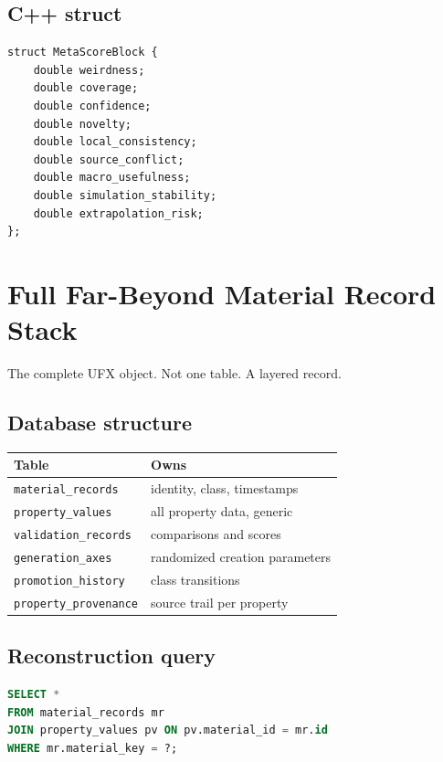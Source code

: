 \documentclass[11pt, a4paper]{article}
\begin{document}
\subsection{C++ struct}

\begin{lstlisting}
struct MetaScoreBlock {
    double weirdness;
    double coverage;
    double confidence;
    double novelty;
    double local_consistency;
    double source_conflict;
    double macro_usefulness;
    double simulation_stability;
    double extrapolation_risk;
};
\end{lstlisting}

\section{Full Far-Beyond Material Record Stack}

The complete UFX object. Not one table. A layered record.

\subsection{Database structure}

\begin{center}
\begin{tabular}{ll}
\toprule
\textbf{Table} & \textbf{Owns} \\
\midrule
\texttt{material\_records}  & identity, class, timestamps \\
\texttt{property\_values}   & all property data, generic \\
\texttt{validation\_records} & comparisons and scores \\
\texttt{generation\_axes}   & randomized creation parameters \\
\texttt{promotion\_history} & class transitions \\
\texttt{property\_provenance} & source trail per property \\
\bottomrule
\end{tabular}
\end{center}

\subsection{Reconstruction query}

\begin{lstlisting}[language=SQL]
SELECT *
FROM material_records mr
JOIN property_values pv ON pv.material_id = mr.id
WHERE mr.material_key = ?;
\end{lstlisting}
\end{document}
